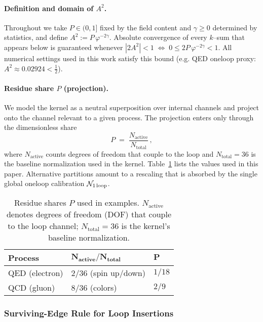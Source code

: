 \documentclass[11pt,a4paper]{article}
\theoremstyle{definition}
\theoremstyle{remark}
\begin{document}
\paragraph{Definition and domain of $A^2$.}
Throughout we take $P\in(0,1]$ fixed by the field content and $\gamma\ge0$ determined by statistics, and define
\(
  A^{2}:=P\,\varphi^{-2\gamma} .
\)
Absolute convergence of every $k$--sum that appears below is guaranteed whenever
\(
  |2A^{2}|<1\;\iff\; 0\le 2P\,\varphi^{-2\gamma}<1.
\)
All numerical settings used in this work satisfy this bound (e.g. QED one\-loop proxy: $A^{2}\approx0.02924<\tfrac12$).

\paragraph{Residue share $P$ (projection).}
We model the kernel as a neutral superposition over internal channels and project onto the channel relevant to a given process. The projection enters only through the dimensionless share
\[
  P\;=\;\frac{N_{\text{active}}}{N_{\text{total}}}\,,
\]
where $N_{\text{active}}$ counts degrees of freedom that couple to the loop and $N_{\text{total}}{=}36$ is the baseline normalization used in the kernel. Table~\ref{tab:residue_share} lists the values used in this paper. Alternative partitions amount to a rescaling that is absorbed by the single global one\-loop calibration $\mathcal N_{\text{1\,loop}}$.

\begin{table}[h]
  \centering
  \caption{Residue shares $P$ used in examples. $N_{\text{active}}$ denotes degrees of freedom (DOF) that couple to the loop channel; $N_{\text{total}}{=}36$ is the kernel's baseline normalization.}
  \label{tab:residue_share}
  \begin{tabular}{lll}
    \toprule
    \textbf{Process} & $\boldsymbol{N_{\text{active}}/N_{\text{total}}}$ & $\boldsymbol{P}$ \\
    \midrule
    QED (electron) & $2/36$ (spin up/down) & $1/18$ \\
    QCD (gluon) & $8/36$ (colors) & $2/9$ \\
    \bottomrule
  \end{tabular}
\end{table}

\subsubsection{Surviving-Edge Rule for Loop Insertions}
\end{document}
